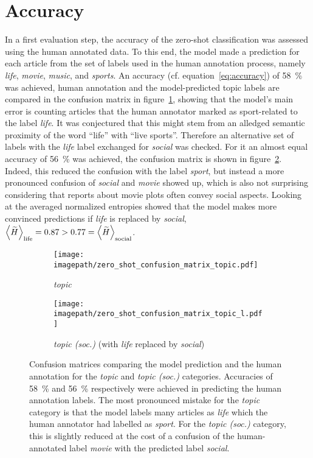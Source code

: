 \section{Accuracy}\label{ch:supervised_accuracy}
In a first evaluation step, the accuracy of the zero-shot classification was assessed using the human annotated data. To this end, the model made a prediction for each article from the set of labels used in the human annotation process, namely \textit{life}, \textit{movie}, \textit{music}, and \textit{sports}. An accuracy (cf. equation~\ref{eq:accuracy}) of \SI{58}{\percent} was achieved, human annotation and the model-predicted topic labels are compared in the confusion matrix in figure~\ref{fig:zero_shot_confusion_matrix_topic}, showing that the model's main error is counting articles that the human annotator marked as sport-related to the label \textit{life}. It was conjectured that this might stem from an alledged semantic proximity of the word ``life'' with ``live sports''. Therefore an alternative set of labels with the \textit{life} label exchanged for \textit{social} was checked. For it an almost equal accuracy of \SI{56}{\percent} was achieved, the confusion matrix is shown in figure~\ref{fig:zero_shot_confusion_matrix_topic_l}. Indeed, this reduced the confusion with the label \textit{sport}, but instead a more pronounced confusion of \textit{social} and \textit{movie} showed up, which is also not surprising considering that reports about movie plots often convey social aspects. Looking at the averaged normalized entropies showed that the model makes more convinced predictions if \textit{life} is replaced by \textit{social}, $\Braket{\widetilde{H}}_\text{life} = 0.87 > 0.77 = \Braket{\widetilde{H}}_\text{social}$.

\begin{figure}
    \centering
    \begin{subfigure}{0.48\textwidth}
        \centering
        \texttt{[image: \\imagepath/zero\_shot\_confusion\_matrix\_topic.pdf]}
        \caption{\textit{topic}}\label{fig:zero_shot_confusion_matrix_topic}
    \end{subfigure}
    \hspace{0.03\textwidth}
    \begin{subfigure}{0.48\textwidth}
        \centering
        \texttt{[image: \\imagepath/zero\_shot\_confusion\_matrix\_topic\_l.pdf]}
        \caption{\textit{topic (soc.)} (with \textit{life} replaced by \textit{social})}\label{fig:zero_shot_confusion_matrix_topic_l}
    \end{subfigure}
    \caption{Confusion matrices comparing the model prediction and the human annotation for the \textit{topic} and \textit{topic (soc.)} categories. Accuracies of \SI{58}{\percent} and \SI{56}{\percent} respectively were achieved in predicting the human annotation labels. The most pronounced mistake for the \textit{topic} category is that the model labels many articles as \textit{life} which the human annotator had labelled as \textit{sport}. For the \textit{topic (soc.)} category, this is slightly reduced at the cost of a confusion of the human-annotated label \textit{movie} with the predicted label \textit{social}.}\label{fig:zero_shot_confusion_matrices}
\end{figure}

